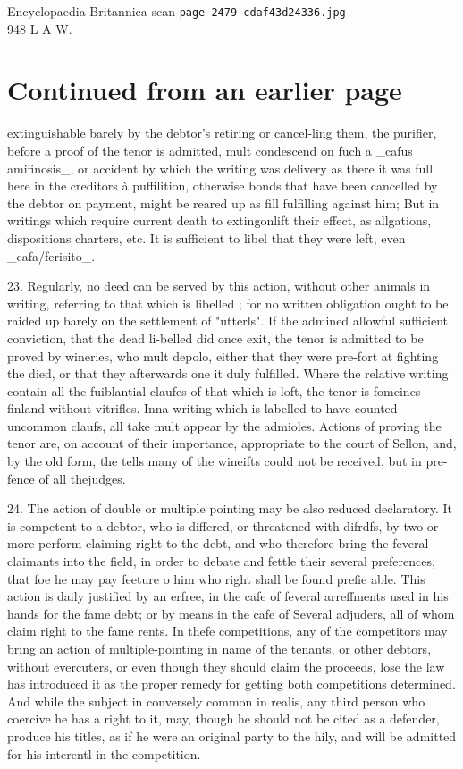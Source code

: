 \documentclass{article}
\begin{document}
\begin{center}
{\Large Encyclopaedia Britannica scan \texttt{page-2479-cdaf43d24336.jpg}}\\[0.5em]
948 L A W.
\end{center}
\section*{Continued from an earlier page}
extinguishable barely by the debtor’s retiring or cancel-ling them, the purifier, before a proof of the tenor is admitted, mult condescend on fuch a \_cafus amifinosis\_, or accident by which the writing was delivery as there it was full here in the creditors à puffilition, otherwise bonds that have been cancelled by the debtor on payment, might be reared up as fill fulfilling against him; But in writings which require current death to extingonlift their effect, as allgations, dispositions charters, etc. It is sufficient to libel that they were left, even \_cafa/ferisito\_.

23. Regularly, no deed can be served by this action, without other animals in writing, referring to that which is libelled ; for no written obligation ought to be raided up barely on the settlement of "utterls". If the admined allowful sufficient conviction, that the dead li-belled did once exit, the tenor is admitted to be proved by wineries, who mult depolo, either that they were pre-fort at fighting the died, or that they afterwards one it duly fulfilled. Where the relative writing contain all the fuiblantial claufes of that which is loft, the tenor is fomeines finland without vitrifles. Inna writing which is labelled to have counted uncommon claufs, all take mult appear by the admioles. Actions of proving the tenor are, on account of their importance, appropriate to the court of Sellon, and, by the old form, the tells many of the wineifts could not be received, but in pre- fence of all thejudges.

24. The action of double or multiple pointing may be also reduced declaratory. It is competent to a debtor, who is differed, or threatened with difrdfs, by two or more perform claiming right to the debt, and who therefore bring the feveral claimants into the field, in order to debate and fettle their several preferences, that foe he may pay feeture o him who right shall be found prefie able. This action is daily justified by an erfree, in the cafe of feveral arreffments used in his hands for the fame debt; or by means in the cafe of Several adjuders, all of whom claim right to the fame rents. In thefe competitions, any of the competitors may bring an action of multiple-pointing in name of the tenants, or other debtors, without evercuters, or even though they should claim the proceeds, lose the law has introduced it as the proper remedy for getting both competitions determined. And while the subject in conversely common in realis, any third person who coercive he has a right to it, may, though he should not be cited as a defender, produce his titles, as if he were an original party to the hily, and will be admitted for his interentl in the competition.
\end{document}
